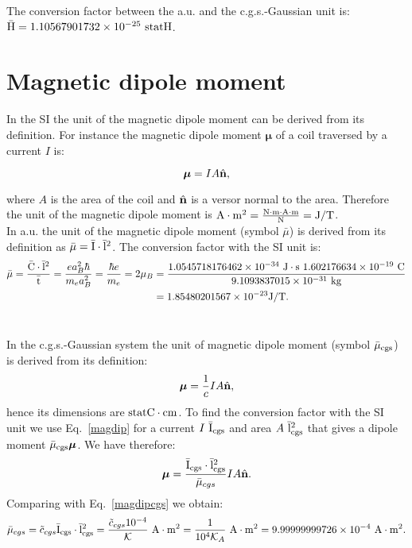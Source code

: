 \documentclass[12pt,a4paper,twoside]{report}
\def\hbarf{1.0545718176462\times 10^{-34}}
\def\e{1.602176634\times 10^{-19}}
\def\me{9.1093837015\times 10^{-31}}
\def\barmu{1.85480201567\times 10^{-23}}
\def\mutomu{9.99999999726\times 10^{-4}}
\def\barycgs{1.10567901732\times 10^{-25}}
\begin{document}
{{\color{green} 
The conversion factor between the a.u. and the c.g.s.-Gaussian unit is: 
${\rm \bar H} = \barycgs\ {\rm statH}$.
}

\newpage
{\color{coral}\section{Magnetic dipole moment}}
\color{black}

In the SI the unit of the magnetic dipole moment
can be derived from its definition. For instance the magnetic dipole 
moment ${\boldsymbol \mu}$ of a coil traversed by a current $I$ is:

\begin{tcolorbox}
\begin{equation}
{\boldsymbol \mu}=IA \hat {\bf n},
\label{magdip}
\end{equation}
\end{tcolorbox}

where $A$ is the area of the coil and $\hat {\bf n}$ is a versor 
normal to the area. Therefore the unit of the magnetic dipole moment is 
${\rm A}\cdot {\rm m}^2={{\rm N} \cdot {\rm m} \cdot  {\rm A} \cdot {\rm m} \over {\rm N}}={\rm J}/{\rm T}$.  
\\

{\color{web-blue} In a.u. the unit of the magnetic dipole moment 
(symbol $\bar \mu$) is derived from its definition as 
$\bar \mu= {\rm \bar I} \cdot {\rm \bar l}^2$. The conversion factor with the SI unit
is: 
\begin{align}
\bar \mu = {{\rm \bar C} \cdot {\rm \bar l}^2 \over {\rm \bar t}}= 
{e a_B^2 \hbar \over m_e a_B^2}
= {\hbar e \over m_e}=2 \mu_B &=
{\hbarf\ {\rm J}\cdot {\rm s}\ \e\ {\rm C} \over \me\ {\rm kg}}\nonumber \\ 
&= \barmu {\rm J}/{\rm T}.
\end{align}
\\
}

{\color{orange} In the c.g.s.-Gaussian system the unit of magnetic dipole
moment (symbol ${\rm \bar \mu_{cgs}}$) is derived from its definition:
\begin{equation}
{\boldsymbol \mu}={1\over c} I A \hat {\bf n},
\label{magdipcgs}
\end{equation}
hence its dimensions are 
${\rm statC}\cdot {\rm cm}$. To find the conversion factor with the SI unit we use
Eq.~\ref{magdip} for a current $I\ {\rm \bar I_{cgs}}$ and area $A\ {\rm \bar l_{cgs}}^2$
that gives a dipole moment ${\rm \bar \mu_{cgs}} {\boldsymbol \mu}$. We have
therefore:
\begin{equation}
{\boldsymbol \mu} = {{\rm \bar I_{cgs}}\cdot {\rm \bar l_{cgs}}^2 \over \bar \mu_{cgs} }
I A \hat {\bf n}.
\end{equation} 
Comparing with Eq.~\ref{magdipcgs} we obtain:
\begin{equation}
\bar \mu_{cgs}= \tilde c_{cgs} {\rm \bar I_{cgs}}\cdot {\rm \bar l_{cgs}}^2= 
{\tilde c_{cgs} 10^{-4} \over \mathcal{K}}\ {\rm A}\cdot {\rm m}^2 = 
{1\over 10^4 \mathcal{K}_A}\ {\rm A}\cdot {\rm m}^2 = \mutomu\ {\rm A}\cdot {\rm m}^2.
\end{equation}
}
\\

}
\end{document}
